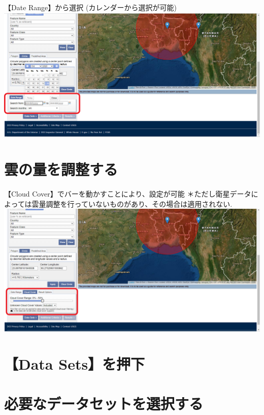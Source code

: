 \documentclass[
]{book}
\begin{document}
【Date Range】から選択
(カレンダーから選択が可能)
\includegraphics{images/date.png}

\hypertarget{ux96f2ux306eux91cfux3092ux8abfux6574ux3059ux308b}{%
\section{雲の量を調整する}\label{ux96f2ux306eux91cfux3092ux8abfux6574ux3059ux308b}}

【Cloud Cover】でバーを動かすことにより、設定が可能
＊ただし衛星データによっては雲量調整を行っていないものがあり、その場合は適用されない.\\
\includegraphics{images/cloud.png}

\hypertarget{data-setsux3092ux62bcux4e0b}{%
\section{【Data Sets】を押下}\label{data-setsux3092ux62bcux4e0b}}

\hypertarget{ux5fc5ux8981ux306aux30c7ux30fcux30bfux30bbux30c3ux30c8ux3092ux9078ux629eux3059ux308b}{%
\section{必要なデータセットを選択する}\label{ux5fc5ux8981ux306aux30c7ux30fcux30bfux30bbux30c3ux30c8ux3092ux9078ux629eux3059ux308b}}
\end{document}
